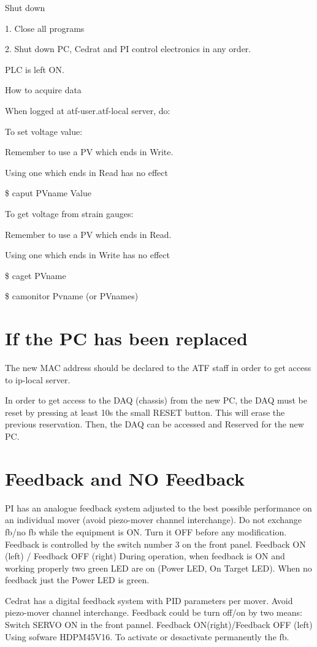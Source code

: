 Shut down\par
1. Close all programs\par
2. Shut down PC, Cedrat and PI control electronics in any order.\par
PLC is left ON.\par
How to acquire data\par
When logged at atf-user.atf-local server, do:\par
To set voltage value:\par
Remember to use a PV which ends in Write.\par
Using one which ends in Read has no effect\par
\$ caput PVname Value\par
To get voltage from strain gauges:\par
Remember to use a PV which ends in Read.\par
Using one which ends in Write has no effect\par
\$ caget PVname\par
\$ camonitor Pvname (or PVnames)\par

\section{If the PC has been replaced}
The new MAC address should be declared to the ATF staff in order to get access to ip-local server.\par
In order to get access to the DAQ (chassis) from the new PC, the DAQ must be reset by pressing at least 10s the small RESET button. This will erase the previous reservation. Then, the DAQ can be accessed and Reserved for the new PC.

\section{Feedback and NO Feedback}
PI has an analogue feedback system adjusted to the best possible performance on an individual mover (avoid piezo-mover channel interchange). Do not exchange fb/no fb while the equipment is ON. Turn it OFF before any modification. 
Feedback is controlled by the switch number 3  on the front panel. 
Feedback ON (left) / Feedback OFF (right)
During operation, when feedback is ON and working properly two green LED are on (Power LED, On Target LED). When no feedback just the Power LED is green.

Cedrat has a digital feedback system with PID parameters per mover. Avoid piezo-mover channel interchange. Feedback could be turn off/on by two means:
Switch SERVO ON in the front pannel. Feedback ON(right)/Feedback OFF (left)
Using sofware  HDPM45V16. To activate or desactivate permanently the fb.\par 

